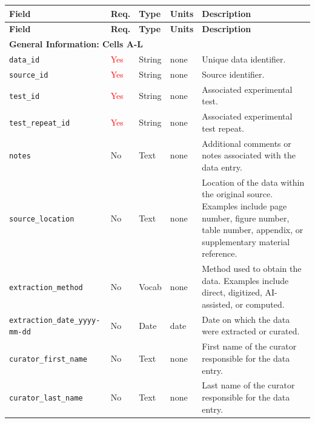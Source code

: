 \documentclass[11pt]{book}
\begin{document}
\begin{longtable}{p{}p{}p{}p{}p{}}

\hline
\textbf{Field} &
\textbf{Req.} &
\textbf{Type} &
\textbf{Units} &
\textbf{Description} \\
\hline
\endfirsthead

\hline
\textbf{Field} &
\textbf{Req.} &
\textbf{Type} &
\textbf{Units} &
\textbf{Description} \\
\hline
\endhead

\multicolumn{5}{l}{\textbf{General Information: Cells A-L}} \\
\hline

\texttt{data\_id} &
\textcolor{red}{Yes} &
String &
none &
Unique data identifier. \\

\texttt{source\_id} &
\textcolor{red}{Yes} &
String &
none &
Source identifier. \\

\texttt{test\_id} &
\textcolor{red}{Yes} &
String &
none &
Associated experimental test. \\

\texttt{test\_repeat\_id} &
\textcolor{red}{Yes} &
String &
none &
Associated experimental test repeat. \\


\texttt{notes} &
No &
Text &
none &
Additional comments or notes associated with the data entry. \\

\texttt{source\_location} &
No &
Text &
none &
Location of the data within the original source. Examples include page number,
figure number, table number, appendix, or supplementary material reference. \\

\texttt{extraction\_method} &
No &
Vocab &
none &
Method used to obtain the data. Examples include direct, digitized,
AI-assisted, or computed. \\

\texttt{extraction\_date\_yyyy-mm-dd} &
No &
Date &
date &
Date on which the data were extracted or curated. \\

\texttt{curator\_first\_name} &
No &
Text &
none &
First name of the curator responsible for the data entry. \\

\texttt{curator\_last\_name} &
No &
Text &
none &
Last name of the curator responsible for the data entry. \\


\end{longtable}
\end{document}
